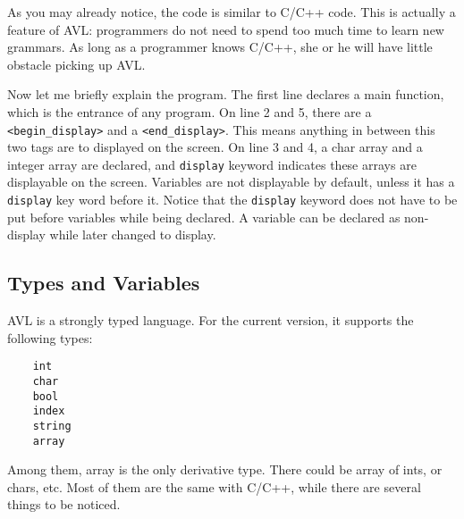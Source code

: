 As you may already notice, the code is similar to C/C++ code. This is actually a feature of AVL:
programmers do not need to spend too much time to learn new grammars. As long as a programmer knows
C/C++, she or he will have little obstacle picking up AVL.

Now let me briefly explain the program.  The first line declares a main function, which is the
entrance of any program. On line 2 and 5, there are a \verb"<begin_display>" and a
\verb"<end_display>". This means anything in between this two tags are to displayed on the screen.
On line 3 and 4, a char array and a integer array are declared, and \verb"display" keyword indicates
these arrays are displayable on the screen. Variables are not displayable by default, unless it has
a \verb"display" key word before it.  Notice that the \verb"display" keyword does not have to be put
before variables while being declared. A variable can be declared as non-display while later changed
to display.


\subsection{Types and Variables}

AVL is a strongly typed language. For the current version, it supports the following types:

\begin{verbatim}
    int
    char
    bool
    index
    string
    array
\end{verbatim}

Among them, array is the only derivative type. There could be array of ints, or chars, etc. Most of
them are the same with C/C++, while there are several things to be noticed.

